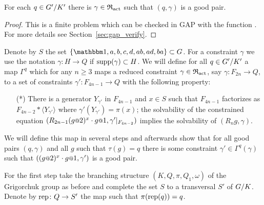 \documentclass[a4paper,11pt]{amsart}
\begin{document}
\begin{lem} \label{lem:existsGoodGamma}
 For each $q\in{G'/K'}$ there is $\gamma\in \mathfrak{R}_{\operatorname{act}}$ such that $(q,\gamma)$ is a 
 good pair.
\end{lem}
\begin{proof}
 This is a finite problem which can be checked in GAP with the function .
 For more details see Section~\ref{sec:gap_verify}.
\end{proof}

Denote by $S$ the set $\{\id,a,b,c,d,ab,ad,ba\}\subset G$.  For a
constraint $\gamma$ we use the notation $\gamma\colon H \to Q$ if
$\operatorname{{supp}}(\gamma) \subset H$.  We will define for all $q\in {G'/K'}$
a map $\Gamma^q$ which for any $n \ge 3$ maps a reduced constraint
$\gamma\in\mathfrak{R}_{\operatorname{act}}$, say $\gamma\colon F_{2n} \to Q$, to a set of
constraints $\gamma'\colon F_{4n-1}\to Q$ with the following property:
\begin{itemize}
  \item[(*)]
  There is a generator $Y_{\gamma'}$ in $F_{4n-1}$ and $x\in S$ such that
  $F_{4n-1}$ factorizes as $F_{4n-2} * \langle Y_{\gamma'} \rangle$ where $\gamma'(Y_{\gamma'})=\pi(x)$; 
  the solvability of the constrained equation $(R_{2n-1} (g\at{2})^x \cdot g\at{1},\gamma'|_{F_{4n-2}})$
  implies the solvability of $(R_ng,\gamma)$.
 \end{itemize}

 We will define this map in several steps and afterwards show that for all good 
 pairs $(q,\gamma)$ and all $g$ such that $\tau(g)=q$ there is some constraint 
 $\gamma' \in \Gamma^q(\gamma)$ such that $((g\at{2})^x \cdot g\at{1},\gamma')$ is a good pair.
 
 For the first step take the branching structure $(K,Q,\pi,Q_1,\omega)$ of the 
 Grigorchuk group as before and complete the set $S$ to a transversal $S'$ 
 of ${G/K}$. Denote by $\operatorname{rep}\colon Q\to S'$  the map such that 
 $\pi(\operatorname{rep}(q)) = q$.
 
\end{document}
